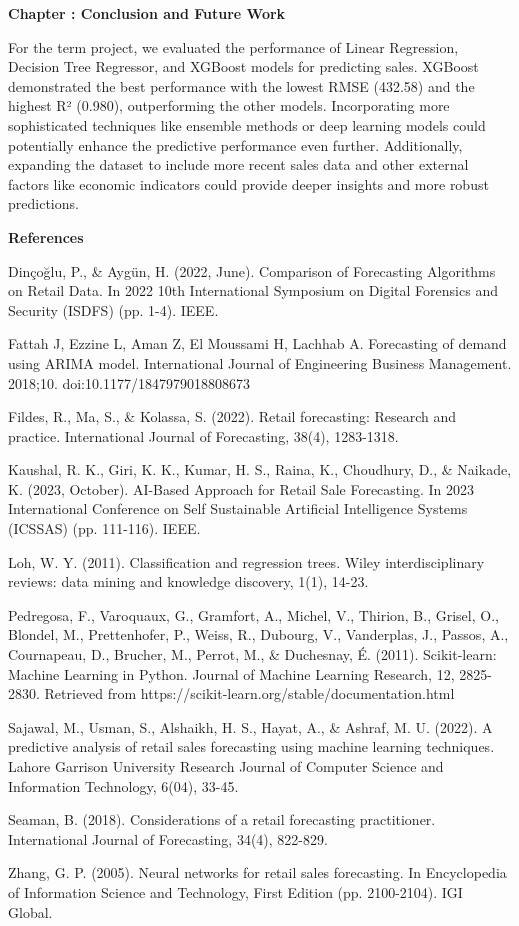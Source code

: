 \documentclass{article}
\newcounter{chapter}
\renewcommand{\thechapter}{\arabic{chapter}}
\newcommand{\mychapter}[1]{
    \stepcounter{chapter}
    \clearpage %
    \noindent
    \begin{center}
        \LARGE\bfseries Chapter \thechapter: #1
    \end{center}
    \vspace{0.25in} %
}
\begin{document}
\mychapter{Conclusion and Future Work}

For the term project, we evaluated the performance of Linear Regression, Decision Tree Regressor, and XGBoost models for predicting sales. XGBoost demonstrated the best performance with the lowest RMSE (432.58) and the highest R² (0.980), outperforming the other models. Incorporating more sophisticated techniques like ensemble methods or deep learning models could potentially enhance the predictive performance even further. Additionally, expanding the dataset to include more recent sales data and other external factors like economic indicators could provide deeper insights and more robust predictions.

\clearpage %
\noindent
\begin{center}
    \LARGE\bfseries References
\end{center}
\vspace{0.5in} %


Dinçoğlu, P., \& Aygün, H. (2022, June). Comparison of Forecasting Algorithms on Retail Data. In 2022 10th International Symposium on Digital Forensics and Security (ISDFS) (pp. 1-4). IEEE.

Fattah J, Ezzine L, Aman Z, El Moussami H, Lachhab A. Forecasting of demand using ARIMA model. International Journal of Engineering Business Management. 2018;10. doi:10.1177/1847979018808673

Fildes, R., Ma, S., \& Kolassa, S. (2022). Retail forecasting: Research and practice. International Journal of Forecasting, 38(4), 1283-1318.

Kaushal, R. K., Giri, K. K., Kumar, H. S., Raina, K., Choudhury, D., \& Naikade, K. (2023, October). AI-Based Approach for Retail Sale Forecasting. In 2023 International Conference on Self Sustainable Artificial Intelligence Systems (ICSSAS) (pp. 111-116). IEEE.

Loh, W. Y. (2011). Classification and regression trees. Wiley interdisciplinary reviews: data mining and knowledge discovery, 1(1), 14-23.

Pedregosa, F., Varoquaux, G., Gramfort, A., Michel, V., Thirion, B., Grisel, O., Blondel, M., Prettenhofer, P., Weiss, R., Dubourg, V., Vanderplas, J., Passos, A., Cournapeau, D., Brucher, M., Perrot, M., \& Duchesnay, É. (2011). Scikit-learn: Machine Learning in Python. Journal of Machine Learning Research, 12, 2825-2830. Retrieved from https://scikit-learn.org/stable/documentation.html

Sajawal, M., Usman, S., Alshaikh, H. S., Hayat, A., \& Ashraf, M. U. (2022). A predictive analysis of retail sales forecasting using machine learning techniques. Lahore Garrison University Research Journal of Computer Science and Information Technology, 6(04), 33-45.

Seaman, B. (2018). Considerations of a retail forecasting practitioner. International Journal of Forecasting, 34(4), 822-829.

Zhang, G. P. (2005). Neural networks for retail sales forecasting. In Encyclopedia of Information Science and Technology, First Edition (pp. 2100-2104). IGI Global.
\end{document}
